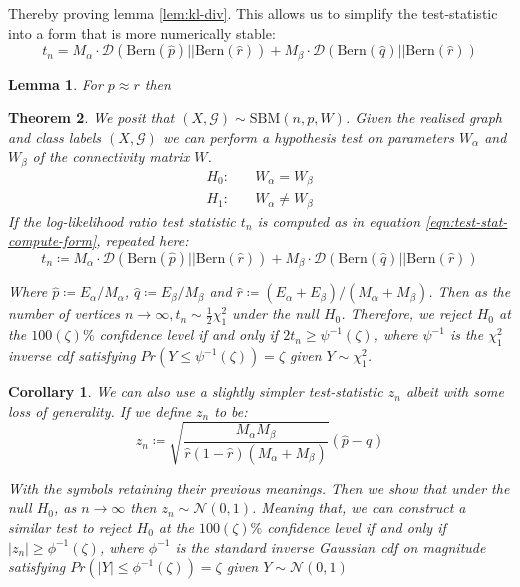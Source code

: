 \documentclass[]{article}
\newcommand{\Gaussian}{\mathcal{N}}
\newcommand{\Gcal}{\mathcal{G}}
\newcommand{\kl}{\mathcal{D}}
\newtheorem{theorem}{Theorem}[section]
\newtheorem{corollary}{Corollary}[theorem]
\newtheorem{lemma}[theorem]{Lemma}
\begin{document}
Thereby proving lemma \ref{lem:kl-div}. This allows us to simplify the test-statistic into a form that is more numerically stable:
%
\begin{equation}
	t_n = M_\alpha \cdot \kl\left( \textrm{Bern}(\hat{p}) || \textrm{Bern}(\hat{r})\right) + 
	M_\beta \cdot \kl\left( \textrm{Bern}(\hat{q}) || \textrm{Bern}(\hat{r})\right)
	\label{eqn:test-stat-compute-form}
\end{equation}

\begin{lemma}
	For $p \approx r$ then 
\end{lemma}

\begin{theorem}
	We posit that $(X, \Gcal) \sim \textrm{SBM}(n, p, W)$. Given the realised graph and class labels $(X, \Gcal)$ we can perform a hypothesis test on parameters $W_\alpha$ and $W_\beta$ of the connectivity matrix $W$.
	\begin{align*}
	H_0:& \quad W_{\alpha} = W_{\beta} \\
	H_1:& \quad W_{\alpha} \neq W_{\beta}
	\end{align*}
	If the log-likelihood ratio test statistic $t_n$ is computed as in equation \ref{eqn:test-stat-compute-form}, repeated here:
	\begin{equation*}
		t_n \coloneqq  M_\alpha \cdot \kl\left( \textrm{Bern}(\hat{p}) || \textrm{Bern}(\hat{r})\right) + 
		M_\beta \cdot \kl\left( \textrm{Bern}(\hat{q}) || \textrm{Bern}(\hat{r})\right)
	\end{equation*}
	
	Where $\hat{p} \coloneqq E_\alpha / M_\alpha$, $\hat{q} \coloneqq E_\beta / M_\beta$ and $\hat{r} \coloneqq (E_\alpha + E_\beta) / (M_\alpha + M_\beta)$. Then as the number of vertices $n \rightarrow \infty, t_n \sim \frac{1}{2} \chi^2_1$ under the null $H_0$. Therefore, we reject $H_0$ at the $100(\zeta)\%$ confidence level if and only if $2t_n \geq \psi^{-1}(\zeta)$, where $\psi^{-1}$ is the $\chi^2_1$ inverse cdf satisfying $Pr(Y \leq \psi^{-1}(\zeta)) = \zeta$ given $Y \sim \chi^2_1$.
	
	\label{theorem:hyp-test-sbm-chi}
\end{theorem}

\begin{corollary}
	We can also use a slightly simpler test-statistic $z_n$ albeit with some loss of generality. If we define $z_n$ to be:
	\begin{equation*}
		z_n \coloneqq \sqrt{\frac{M_\alpha M_\beta}{\hat{r}(1-\hat{r})(M_\alpha + M_\beta)}} \left( \hat{p} - \hat{q} \right)
	\end{equation*}
	
	With the symbols retaining their previous meanings. Then we show that under the null $H_0$, as $n \rightarrow \infty$ then $z_n \sim \Gaussian(0, 1)$. Meaning that, we can construct a similar test to reject $H_0$ at the $100(\zeta)\%$ confidence level if and only if $|z_n| \geq \phi^{-1}(\zeta)$, where $\phi^{-1}$ is the standard inverse Gaussian cdf on magnitude satisfying $Pr(|Y| \leq \phi^{-1}(\zeta)) = \zeta$ given $Y \sim \Gaussian(0, 1)$
\end{corollary}
\end{document}
